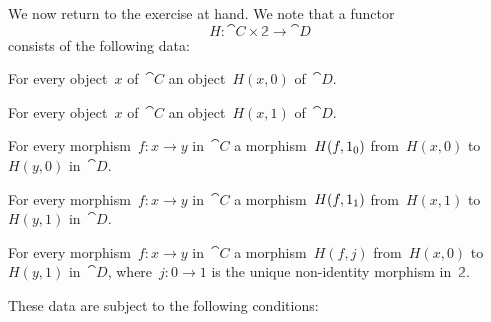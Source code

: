 We now return to the exercise at hand.
We note that a functor
\[
	H \colon \cat{C} × 𝟚 \to \cat{D}
\]
consists of the following data:
\begin{enumerate*}[label = D\arabic*., ref = D\arabic*]

	\item
		\label{data of H (x, 0)}
		For every object~$x$ of~$\cat{C}$ an object~$H (x, 0)$ of~$\cat{D}$.

	\item
		\label{data of H (x, 1)}
		For every object~$x$ of~$\cat{C}$ an object~$H (x, 1)$ of~$\cat{D}$.

	\item
		\label{data of H (f, id0)}
		For every morphism~$f \colon x \to y$ in~$\cat{C}$ a morphism~$H (f, 1_0)$ from~$H (x, 0)$ to~$H (y, 0)$ in~$\cat{D}$.

	\item
		\label{data of H (f, id1)}
		For every morphism~$f \colon x \to y$ in~$\cat{C}$ a morphism~$H (f, 1_1)$ from~$H (x, 1)$ to~$H (y, 1)$ in~$\cat{D}$.

	\item
		\label{data of H (f, j)}
		For every morphism~$f \colon x \to y$ in~$\cat{C}$ a morphism~$H (f, j)$ from~$H (x, 0)$ to~$H (y, 1)$ in~$\cat{D}$, where~$j \colon 0 \to 1$ is the unique non-identity morphism in~$𝟚$.

\end{enumerate*}
These data are subject to the following conditions:
